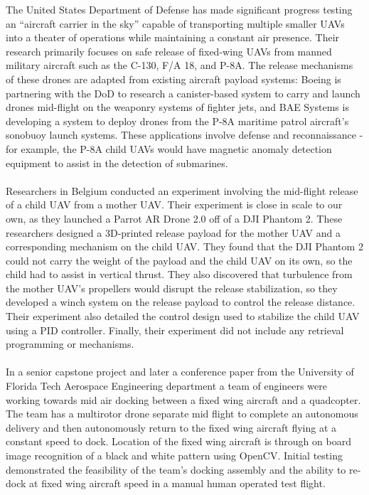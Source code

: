 \documentclass[11pt]{article}
\begin{document}
The United States Department of Defense has made significant progress testing an “aircraft carrier in the sky” capable of transporting multiple smaller UAVs into a theater of operations while maintaining a constant air presence. Their research primarily focuses on safe release of fixed-wing UAVs from manned military aircraft such as the C-130, F/A 18, and P-8A. The release mechanisms of these drones are adapted from existing aircraft payload systems: Boeing is partnering with the DoD to research a canister-based system to carry and launch drones mid-flight on the weaponry systems of fighter jets, and BAE Systems is developing a system to deploy drones from the P-8A maritime patrol aircraft’s sonobuoy launch systems. These applications involve defense and reconnaissance - for example, the P-8A child UAVs would have magnetic anomaly detection equipment to assist in the detection of submarines.\cite{garrun_2015}\\\\
Researchers in Belgium conducted an experiment involving the mid-flight release of a child UAV from a mother UAV. Their experiment is close in scale to our own, as they launched a Parrot AR Drone 2.0 off of a DJI Phantom 2. These researchers designed a 3D-printed release payload for the mother UAV and a corresponding mechanism on the child UAV. They found that the DJI Phantom 2 could not carry the weight of the payload and the child UAV on its own, so the child had to assist in vertical thrust. They also discovered that turbulence from the mother UAV’s propellers would disrupt the release stabilization, so they developed a winch system on the release payload to control the release distance. Their experiment also detailed the control design used to stabilize the child UAV using a PID controller. Finally, their experiment did not include any retrieval programming or mechanisms.\cite{inproceedings}\\\\
In a senior capstone project and later a conference paper from the University of Florida Tech Aerospace Engineering department a team of engineers were working towards mid air docking between a fixed wing aircraft and a quadcopter. The team has a multirotor drone separate mid flight to complete an autonomous delivery and then autonomously return to the fixed wing aircraft flying at a constant speed to dock. Location of the fixed wing aircraft is through on board image recognition of a black and white pattern using OpenCV. Initial testing demonstrated the feasibility of the team's docking assembly and the ability to re-dock at fixed wing aircraft speed in a manual human operated test flight.\cite{9438229}\\\\
\end{document}

